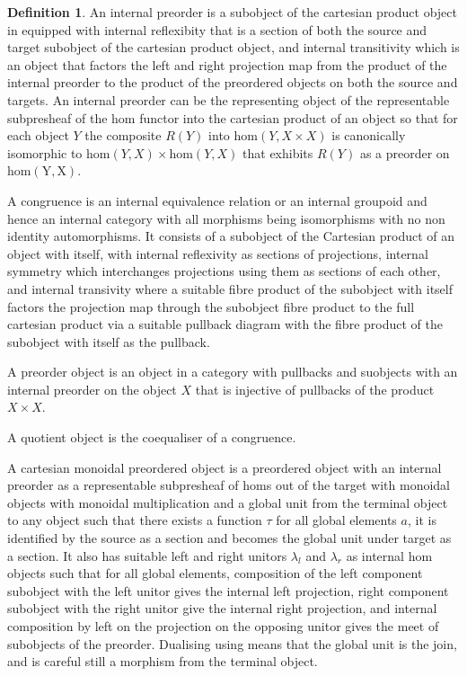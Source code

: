 \documentclass[10pt]{article}
\theoremstyle{plain}%
\theoremstyle{definition}
\newtheorem{definition}{Definition}[section]
\theoremstyle{remark}
\begin{document}
\begin{definition}
    An internal preorder is a subobject of the cartesian product object in equipped with internal reflexibity that is a section of both the source and target subobject of the cartesian product object, and internal transitivity which is an object that factors the left and right projection map from the product of the internal preorder to the product of the preordered objects on both the source and targets. An internal preorder can be the representing object of the representable subpresheaf of the hom functor into the cartesian product of an object so that for each object $Y$ the composite $R(Y)$ into $\mathrm{hom}(Y, X \times X)$ is canonically isomorphic to $\mathrm{hom}(Y,X) \times \mathrm{hom}(Y,X)$ that exhibits $R(Y)$ as a preorder on $\mathrm{hom(Y,X)}$.

    A congruence is an internal equivalence relation or an internal groupoid and hence an internal category with all morphisms being isomorphisms with no non identity automorphisms. It consists of a subobject of the Cartesian product of an object with itself, with internal reflexivity as sections of projections, internal symmetry which interchanges projections using them as sections of each other, and internal transivity where a suitable fibre product of the subobject with itself factors the projection map through the subobject fibre product to the full cartesian product via a suitable pullback diagram with the fibre product of the subobject with itself as the pullback.

    A preorder object is an object in a category with pullbacks and suobjects with an internal preorder on the object $X$ that is injective  of pullbacks of the product $X \times X$.

    A quotient object is the coequaliser of a congruence.

    A cartesian monoidal preordered object is a preordered object with an internal preorder as a representable subpresheaf of homs out of the target with monoidal objects with monoidal multiplication and a global unit from the terminal object to any object such that there exists a function $\tau$ for all global elements $a$, it is identified by the source as a section and becomes the global unit under target as a section. It also has suitable left and right unitors $\lambda_l$ and $\lambda_r$ as internal hom objects such that for all global elements, composition of the left component subobject with the left unitor gives the internal left projection, right component subobject with the right unitor give the internal right projection, and internal composition by left on the projection on the opposing unitor gives the meet of subobjects of the preorder. Dualising using means that the global unit is the join, and is careful still a morphism from the terminal object.


\end{definition}
\end{document}
